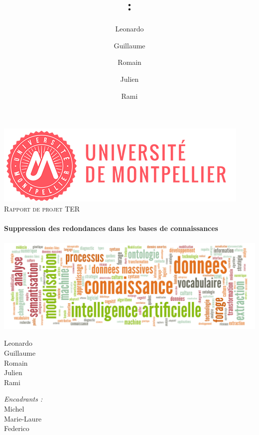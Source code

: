 \documentclass[a4paper]{article}
\title{: \\ }
\author{
  Leonardo \bsc{Moros} \\
  \and
  Guillaume \bsc{Pérution-Kihli} \\
  \and
  Romain \bsc{Ricalens} \\
  \and
  Julien \bsc{Rodriguez} \\
  \and
  Rami \bsc{Younes} \\}
\begin{document}
    \begin{titlepage}
      \begin{sffamily}
            \begin{center}
                \includegraphics[scale=0.6]{pictures/logo_um.png} \\[1cm]
                \textsc{\Large Rapport de projet TER }\\[1cm]
                    
                \HRule \\[0.4cm]{ \huge \bfseries Suppression des redondances dans les bases de connaissances\\[0.4cm] }
                \HRule \\[1.5cm]
                
                \includegraphics[width=\textwidth]{pictures/websem2018-1072x368px.png}
                \\[1.5cm]
                    
                \begin{minipage}{0.4\textwidth}
                    \begin{flushleft} \large
                        Leonardo  \\
                          Guillaume  \\
                          Romain  \\
                          Julien  \\
                          Rami  
                    \end{flushleft}
                \end{minipage}
                \begin{minipage}{0.4\textwidth}
                    \begin{flushright} \large
                        \emph{Encadrants :} \\ Michel  \\ Marie-Laure  \\ Federico 
                    \end{flushright}
                \end{minipage}
                    

\end{center}
\end{sffamily}
\end{titlepage}
\end{document}
